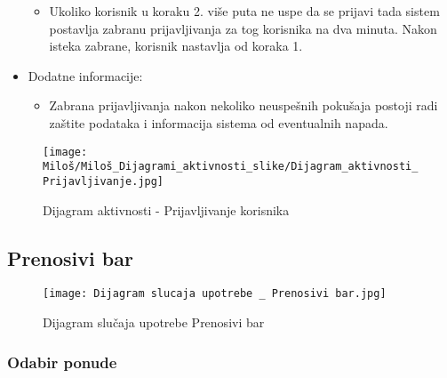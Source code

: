 \documentclass[a4paper]{article}
\begin{document}
\begin{itemize}
\begin{itemize}
            \item Ukoliko korisnik u koraku 2. više puta ne uspe da se prijavi tada sistem postavlja zabranu prijavljivanja za tog korisnika na dva minuta. Nakon isteka zabrane, korisnik nastavlja od koraka 1.
        \end{itemize}
    \item Dodatne informacije:
        \begin{itemize}
            \item Zabrana prijavljivanja nakon nekoliko neuspešnih pokušaja postoji radi zaštite podataka i informacija sistema od eventualnih napada.
        \end{itemize}
\end{itemize}


\begin{figure}[htp]
    \centering
    \texttt{[image: Miloš/Miloš\_Dijagrami\_aktivnosti\_slike/Dijagram\_aktivnosti\_Prijavljivanje.jpg]}
    \caption{Dijagram aktivnosti - Prijavljivanje korisnika}
    \label{fig:Prijavljivanje aktivnost}
\end{figure}



\subsection{Prenosivi bar}

\begin{figure}[H]
    \centering
    \texttt{[image: Dijagram slucaja upotrebe \_ Prenosivi bar.jpg]}
    \caption{Dijagram slučaja upotrebe Prenosivi bar}
    \label{fig:PrenosiviBar}
\end{figure}

\subsubsection{Odabir ponude}
\end{document}
